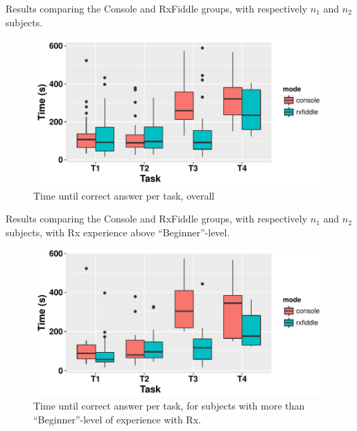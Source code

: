 \begin{table}[htbp]
    \centering
    {\centering}
    \caption{Results comparing the Console and RxFiddle groups, with
    respectively $n_1$ and $n_2$ subjects.}
    \label{table:result}
\end{table}

\begin{figure}[htbp]
    \includegraphics[width=\columnwidth]{images/timePerTask.pdf}
    \caption{Time until correct answer per task, overall}%
    \label{fig:timePerTask}
\end{figure}

\begin{table}[htbp]
    \centering
    {\centering}
    \caption{Results comparing the Console and RxFiddle groups, with
    respectively $n_1$ and $n_2$ subjects, with Rx experience above
    ``Beginner''-level.}
    \label{table:result-split}
\end{table}

\begin{figure}[htbp]
    \includegraphics[width=\columnwidth]{images/timePerTaskRx.pdf}
    \caption{Time until correct answer per task, for subjects with more
    than ``Beginner''-level of experience with Rx.}%
    \label{fig:timePerTaskRx}
\end{figure}


